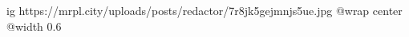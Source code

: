 
 
 
 
 

\ifcmt
  ig https://mrpl.city/uploads/posts/redactor/7r8jk5gejmnjs5ue.jpg
  @wrap center
  @width 0.6
\fi
